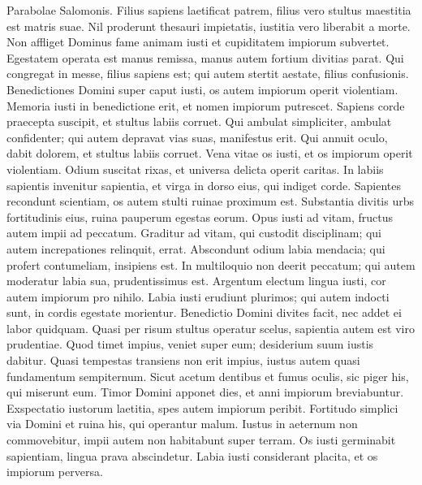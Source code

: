 \begin{biblechapter}
\begin{biblechapter}
\begin{biblechapter}
\begin{biblechapter}
\begin{biblechapter}
\begin{biblechapter}
\begin{biblechapter}
\begin{biblechapter}
\begin{biblechapter}
\begin{biblechapter}
 \verse Parabolae Salomonis.
 Filius sapiens laetificat patrem,
 filius vero stultus maestitia est matris suae.
 \verse Nil proderunt thesauri impietatis,
 iustitia vero liberabit a morte.
 \verse Non affliget Dominus fame animam iusti
 et cupiditatem impiorum subvertet.
 \verse Egestatem operata est manus remissa,
 manus autem fortium divitias parat.
 \verse Qui congregat in messe, filius sapiens est;
 qui autem stertit aestate, filius confusionis.
 \verse Benedictiones Domini super caput iusti,
 os autem impiorum operit violentiam.
 \verse Memoria iusti in benedictione erit,
 et nomen impiorum putrescet.
 \verse Sapiens corde praecepta suscipit,
 et stultus labiis corruet.
 \verse Qui ambulat simpliciter, ambulat confidenter;
 qui autem depravat vias suas, manifestus erit.
 \verse Qui annuit oculo, dabit dolorem,
 et stultus labiis corruet.
 \verse Vena vitae os iusti,
 et os impiorum operit violentiam.
 \verse Odium suscitat rixas,
 et universa delicta operit caritas.
 \verse In labiis sapientis invenitur sapientia,
 et virga in dorso eius, qui indiget corde.
 \verse Sapientes recondunt scientiam,
 os autem stulti ruinae proximum est.
 \verse Substantia divitis urbs fortitudinis eius,
 ruina pauperum egestas eorum.
 \verse Opus iusti ad vitam,
 fructus autem impii ad peccatum.
 \verse Graditur ad vitam, qui custodit disciplinam;
 qui autem increpationes relinquit, errat.
 \verse Abscondunt odium labia mendacia;
 qui profert contumeliam, insipiens est.
 \verse In multiloquio non deerit peccatum;
 qui autem moderatur labia sua, prudentissimus est.
 \verse Argentum electum lingua iusti,
 cor autem impiorum pro nihilo.
 \verse Labia iusti erudiunt plurimos;
 qui autem indocti sunt, in cordis egestate morientur.
 \verse Benedictio Domini divites facit,
 nec addet ei labor quidquam.
 \verse Quasi per risum stultus operatur scelus,
 sapientia autem est viro prudentiae.
 \verse Quod timet impius, veniet super eum;
 desiderium suum iustis dabitur.
 \verse Quasi tempestas transiens non erit impius,
 iustus autem quasi fundamentum sempiternum.
 \verse Sicut acetum dentibus et fumus oculis,
 sic piger his, qui miserunt eum.
 \verse Timor Domini apponet dies,
 et anni impiorum breviabuntur.
 \verse Exspectatio iustorum laetitia,
 spes autem impiorum peribit.
 \verse Fortitudo simplici via Domini
 et ruina his, qui operantur malum.
 \verse Iustus in aeternum non commovebitur,
 impii autem non habitabunt super terram.
 \verse Os iusti germinabit sapientiam,
 lingua prava abscindetur.
 \verse Labia iusti considerant placita,
 et os impiorum perversa.
 

\end{biblechapter}
\end{biblechapter}
\end{biblechapter}
\end{biblechapter}
\end{biblechapter}
\end{biblechapter}
\end{biblechapter}
\end{biblechapter}
\end{biblechapter}
\end{biblechapter}
